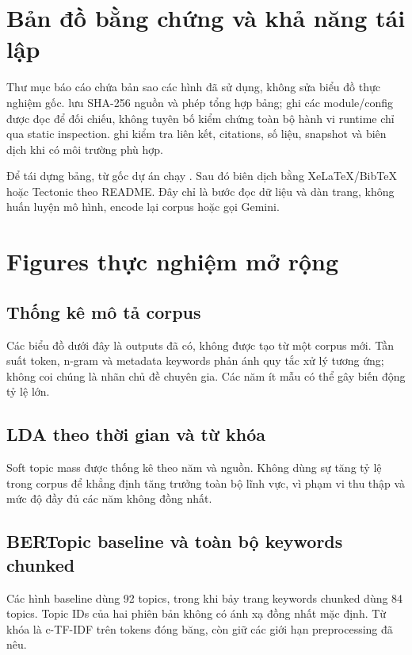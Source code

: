 \chapter{Bản đồ bằng chứng và khả năng tái lập}\label{app:evidence}
Thư mục báo cáo chứa bản sao các hình đã sử dụng, không sửa biểu đồ thực nghiệm gốc.  lưu SHA-256 nguồn và phép tổng hợp bảng;  ghi các module/config được đọc để đối chiếu, không tuyên bố kiểm chứng toàn bộ hành vi runtime chỉ qua static inspection.  ghi kiểm tra liên kết, citations, số liệu, snapshot và biên dịch khi có môi trường phù hợp.

Để tái dựng bảng, từ gốc dự án chạy . Sau đó biên dịch bằng XeLaTeX/BibTeX hoặc Tectonic theo README. Đây chỉ là bước đọc dữ liệu và dàn trang, không huấn luyện mô hình, encode lại corpus hoặc gọi Gemini.

\chapter{Figures thực nghiệm mở rộng}\label{app:figures}
\section{Thống kê mô tả corpus}
Các biểu đồ dưới đây là outputs đã có, không được tạo từ một corpus mới. Tần suất token, n-gram và metadata keywords phản ánh quy tắc xử lý tương ứng; không coi chúng là nhãn chủ đề chuyên gia. Các năm ít mẫu có thể gây biến động tỷ lệ lớn.

\section{LDA theo thời gian và từ khóa}
Soft topic mass được thống kê theo năm và nguồn. Không dùng sự tăng tỷ lệ trong corpus để khẳng định tăng trưởng toàn bộ lĩnh vực, vì phạm vi thu thập và mức độ đầy đủ các năm không đồng nhất.

\section{BERTopic baseline và toàn bộ keywords chunked}
Các hình baseline dùng 92 topics, trong khi bảy trang keywords chunked dùng 84 topics. Topic IDs của hai phiên bản không có ánh xạ đồng nhất mặc định. Từ khóa là c-TF-IDF trên tokens đóng băng, còn giữ các giới hạn preprocessing đã nêu.



